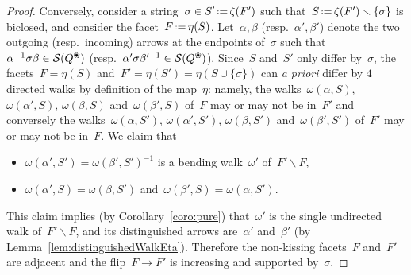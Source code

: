 \documentclass{amsart}
\theoremstyle{definition}
\newcommand{\ssm}{\smallsetminus} %
\newcommand{\eqdef}{\mbox{\,\raisebox{0.2ex}{\scriptsize\ensuremath{\mathrm:}}\ensuremath{=}\,}} %
\newcommand{\apriori}{\textit{a priori}} %
\newcommand{\blossom}{^\text{\ding{96}}} %
\newcommand{\strings}{\mathcal{S}} %
\begin{document}
\begin{proof}
\medskip
Conversely, consider a string~$\sigma \in S' \eqdef \zeta(F')$ such that~$S \eqdef \zeta(F') \ssm \{\sigma\}$ is biclosed, and consider the facet~$F \eqdef \eta(S)$.
Let~$\alpha, \beta$ (resp.~$\alpha', \beta'$) denote the two outgoing (resp.~incoming) arrows at the endpoints of~$\sigma$ such that~$\alpha^{-1}\sigma\beta \in \strings(\bar Q\blossom)$ (resp.~$\alpha'\sigma\beta'^{-1} \in \strings(\bar Q\blossom)$).
Since~$S$ and~$S'$ only differ by~$\sigma$, the facets~$F = \eta(S)$ and~$F' = \eta(S') = \eta(S \cup \{\sigma\})$ can \apriori{} differ by $4$ directed walks by definition of the map~$\eta$: namely, the walks~$\omega(\alpha, S)$, $\omega(\alpha', S)$, $\omega(\beta, S)$ and~$\omega(\beta', S)$ of~$F$ may or may not be in~$F'$ and conversely the walks~$\omega(\alpha, S')$, $ \omega(\alpha', S')$, $\omega(\beta, S')$ and~$\omega(\beta', S')$ of~$F'$ may or may not be in~$F$.
We claim that
\begin{itemize}
\item $\omega(\alpha', S') = \omega(\beta', S')^{-1}$ is a bending walk~$\omega'$ of~$F' \ssm F$,
\item $\omega(\alpha', S) = \omega(\beta, S')$ and~$\omega(\beta', S) = \omega(\alpha, S')$.
\end{itemize}
This claim implies (by Corollary~\ref{coro:pure}) that~$\omega'$ is the single undirected walk of~$F' \ssm F$, and its distinguished arrows are~$\alpha'$ and~$\beta'$ (by Lemma~\ref{lem:distinguishedWalkEta}).
Therefore the non-kissing facets~$F$ and~$F'$ are adjacent and the flip~$F \to F'$ is increasing and supported by~$\sigma$.


\end{proof}
\end{document}

